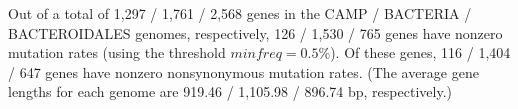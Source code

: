 Out of a total of 1,297 / 1,761 / 2,568 genes in the CAMP / BACTERIA / BACTEROIDALES genomes, respectively, 126 / 1,530 / 765 genes have nonzero mutation rates (using the threshold $minfreq=0.5\%$). Of these genes, 116 / 1,404 / 647 genes have nonzero nonsynonymous mutation rates. (The average gene lengths for each genome are 919.46 / 1,105.98 / 896.74 bp, respectively.)\endinput